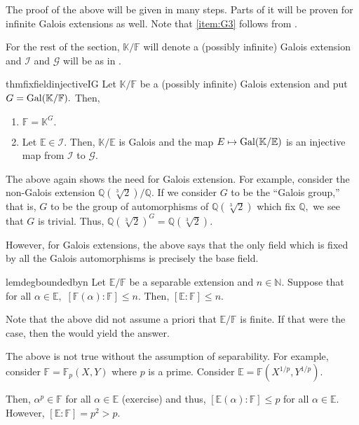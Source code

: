 The proof of the above will be given in many steps. Parts of it will be proven for infinite Galois extensions as well. Note that \ref{item:G3} follows from .

For the rest of the section, $\mathbb{K}/\mathbb{F}$ will denote a {\color{purple}(possibly infinite)} Galois extension and $\mathcal{I}$ and $\mathcal{G}$ will be as in .

\begin{restatable}[]{thm}{fixfieldinjectiveIG}
\label{thm:fixfieldinjectiveIG}
    Let $\mathbb{K}/\mathbb{F}$ be a {\color{purple}(possibly infinite)} Galois extension and put $G = \operatorname{Gal}(\mathbb{K}/\mathbb{F}).$ Then,
    \begin{enumerate}
         \item $\mathbb{F} = \mathbb{K}^G.$
         \item Let $\mathbb{E} \in \mathcal{I}.$ Then, $\mathbb{K}/\mathbb{E}$ is Galois and the map $E \mapsto \operatorname{Gal}(\mathbb{K}/\mathbb{E})$ is an injective map from $\mathcal{I}$ to $\mathcal{G}.$ \hfill\hyperref[thm:fixfieldinjectiveIG2]{\downsym}
     \end{enumerate} 
\end{restatable}

\begin{rem} \label{rem:nonbasemoved}
    The above again shows the need for Galois extension. For example, consider the non-Galois extension $\mathbb{Q}(\sqrt[3]{2})/\mathbb{Q}.$ If we consider $G$ to be the ``Galois group,'' that is, $G$ to be the group of automorphisms of $\mathbb{Q}(\sqrt[3]{2})$ which fix $\mathbb{Q},$ we see that $G$ is trivial. Thus, $\mathbb{Q}(\sqrt[3]{2})^G = \mathbb{Q}(\sqrt[3]{2}).$

    However, for Galois extensions, the above says that the only field which is fixed by all the Galois automorphisms is precisely the base field.
\end{rem}

\begin{restatable}[]{lem}{degboundedbyn}
\label{lem:degboundedbyn}
    Let $\mathbb{E}/\mathbb{F}$ be a separable extension and $n \in \mathbb{N}.$ Suppose that for all $\alpha \in \mathbb{E},$ $[\mathbb{F}(\alpha) : \mathbb{F}] \le n.$ Then, $[\mathbb{E} : \mathbb{F}] \le n.$ \hfill\hyperref[lem:degboundedbyn2]{\downsym}
\end{restatable}

\begin{rem}
    Note that the above did not assume a priori that $\mathbb{E}/\mathbb{F}$ is finite. If that were the case, then the  would yield the answer.

    The above is not true without the assumption of separability. For example, consider $\mathbb{F} = \mathbb{F}_p(X, Y)$ where $p$ is a prime. Consider $\mathbb{E} = \mathbb{F}(X^{1/p}, Y^{1/p}).$

    Then, $\alpha^p \in \mathbb{F}$ for all $\alpha \in \mathbb{E}$ (exercise) and thus, $[\mathbb{E}(\alpha) : \mathbb{F}] \le p$ for all $\alpha \in \mathbb{E}.$ However, $[\mathbb{E} : \mathbb{F}] = p^2 > p.$
\end{rem}

